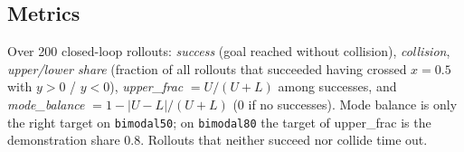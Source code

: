 \subsection{Metrics}
Over 200 closed-loop rollouts: \emph{success} (goal reached without collision), \emph{collision}, \emph{upper/lower share} (fraction of all rollouts that succeeded having crossed $x=0.5$ with $y>0$ / $y<0$), \emph{upper\_frac} $=U/(U+L)$ among successes, and \emph{mode\_balance} $=1-|U-L|/(U+L)$ (0 if no successes). Mode balance is only the right target on \texttt{bimodal50}; on \texttt{bimodal80} the target of upper\_frac is the demonstration share 0.8. Rollouts that neither succeed nor collide time out.
